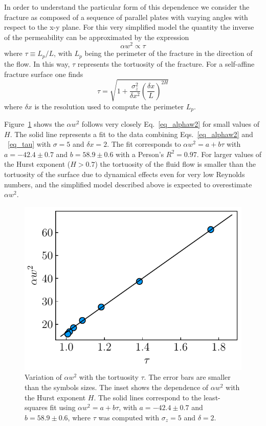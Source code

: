 \documentclass[aps,pre,
superscriptaddress,
twocolumn,
notitlepage,
10pt,]{revtex4-1}
\begin{document}
In order to understand the particular form of this dependence we consider
the fracture as composed of a sequence of parallel plates with varying
angles with respect to the x-y plane. For this very simplified model the
quantity the inverse of the permeability can be approximated by the
expression
\begin{equation}\label{eq_alphaw2}
\alpha w^2 \propto \tau
\end{equation}
where $\tau \equiv L_p/L$, with $L_p$ being the perimeter of the fracture
in the direction of the flow. In this way, $\tau$ represents the tortuosity
of the fracture. For a self-affine fracture surface one finds
\begin{equation}\label{eq_tau}
\tau = \sqrt{1+\frac{\sigma_z^2}{\delta x^2} \left( \frac{\delta
		x}{L}\right)^{2H}}
\end{equation}
where $\delta x$ is the resolution used to compute the perimeter $L_p$.

Figure~\ref{fig3} shows the $\alpha w^2$ follows very closely
Eq.~\eqref{eq_alphaw2} for small values of $H$.  The solid line represents a fit
to the data combining Eqs.~\eqref{eq_alphaw2} and ~\eqref{eq_tau} with
$\sigma=5$ and $\delta x = 2$. The fit corresponds to $\alpha w^2 = a+b \tau$
with $a=-42.4\pm0.7$ and $b=58.9\pm0.6$ with a Person's $R^2=0.97$. For larger values of the Hurst exponent
($H> 0.7$) the tortuosity of the fluid flow is smaller than the tortuosity of
the surface due to dynamical effects even for very low Reynolds numbers, and the
simplified model described above is expected to overestimate $\alpha w^2$.


\begin{figure} %
	\centering %
	\includegraphics[width=0.99\columnwidth]{fig3.pdf} \caption{Variation of
		$\alpha w^2$ with the tortuosity $\tau$. The error bars are smaller than the
		symbols sizes. The inset shows the dependence of $\alpha w^2$ with the Hurst
		exponent $H$. The solid lines correspond to the least-squares fit using
		$\alpha
		w^2=a + b \tau$, with $a=-42.4\pm0.7$ and $b=58.9\pm0.6$, where $\tau$ was
		computed with $\sigma_z=5$ and $\delta = 2$.}\label{fig3} %
\end{figure}
\end{document}
